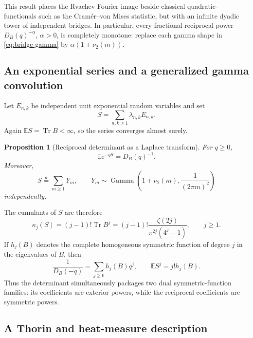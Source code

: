 \documentclass[11pt,oneside]{article}
\newtheorem{proposition}[theorem]{Proposition}
\theoremstyle{definition}
\newcommand{\e}{\mathrm e}
\newcommand{\E}{\mathbb E}
\newcommand{\Tr}{\operatorname{Tr}}
\newcommand{\vtwo}{\nu_2}
\begin{document}
This result places the Rvachev Fourier image beside classical quadratic-functionals
such as the Cram\'er--von Mises statistic, but with an infinite dyadic tower of
independent bridges.  In particular, every fractional reciprocal power
\(D_B(q)^{-\alpha}\), \(\alpha>0\), is completely monotone: replace each gamma shape
in \eqref{eq:bridge-gamma} by \(\alpha(1+\vtwo(m))\).

\subsection{An exponential series and a generalized gamma convolution}

Let \(E_{n,k}\) be independent unit exponential random variables and set
\begin{equation}
 S=\sum_{n,k\ge1}\lambda_{n,k}E_{n,k}.
 \label{eq:S-exp}
\end{equation}
Again \(\E S=\Tr B<\infty\), so the series converges almost surely.

\begin{proposition}[Reciprocal determinant as a Laplace transform]
\label{prop:exp-det}
For \(q\ge0\),
\begin{equation}
 \boxed{\quad
 \E\e^{-qS}=D_B(q)^{-1}.
 \quad}
 \label{eq:exp-det}
\end{equation}
Moreover,
\begin{equation}
 S\stackrel d=\sum_{m\ge1}Y_m,
 \qquad
 Y_m\sim\operatorname{Gamma}
 \left(1+\vtwo(m),\frac1{(2\pi m)^2}\right)
 \label{eq:S-gamma}
\end{equation}
independently.
\end{proposition}

The cumulants of \(S\) are therefore
\begin{equation}
 \kappa_j(S)=(j-1)!\Tr B^j
 =(j-1)!\frac{\zeta(2j)}{\pi^{2j}(4^j-1)},
 \qquad j\ge1.
 \label{eq:S-cumulants}
\end{equation}
If \(h_j(B)\) denotes the complete homogeneous symmetric function of degree \(j\) in
the eigenvalues of \(B\), then
\begin{equation}
 \frac1{D_B(-q)}=\sum_{j\ge0}h_j(B)q^j,
 \qquad
 \E S^j=j!h_j(B).
 \label{eq:h-complete}
\end{equation}
Thus the determinant simultaneously packages two dual symmetric-function families:
its coefficients are exterior powers, while the reciprocal coefficients are symmetric
powers.

\subsection{A Thorin and heat-measure description}
\end{document}
